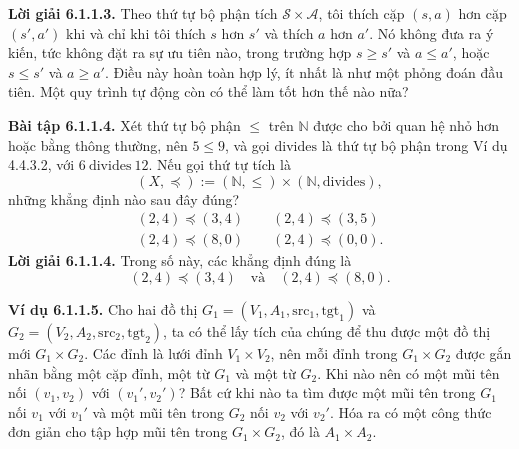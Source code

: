 \noindent\textbf{Lời giải 6.1.1.3.} Theo thứ tự bộ phận tích $\mathcal S\times\mathcal A$, tôi thích cặp $(s,a)$ hơn cặp $(s',a')$ khi và chỉ khi tôi thích $s$ hơn $s'$ và thích $a$ hơn $a'$. Nó không đưa ra ý kiến, tức không đặt ra sự ưu tiên nào, trong trường hợp $s\ge s'$ và $a\le a'$, hoặc $s\le s'$ và $a\ge a'$. Điều này hoàn toàn hợp lý, ít nhất là như một phỏng đoán đầu tiên. Một quy trình tự động còn có thể làm tốt hơn thế nào nữa?

\noindent\textbf{Bài tập 6.1.1.4.} Xét thứ tự bộ phận $\le$ trên $\mathbb N$ được cho bởi quan hệ nhỏ hơn hoặc bằng thông thường, nên $5\le9$, và gọi $\mathrm{divides}$ là thứ tự bộ phận trong Ví dụ 4.4.3.2, với $6\ \mathrm{divides}\ 12$. Nếu gọi thứ tự tích là
\[(X,\preceq):=(\mathbb N,\le)\times(\mathbb N,\mathrm{divides}),\]
những khẳng định nào sau đây đúng?
\[\begin{gathered}(2,4)\preceq(3,4)\qquad(2,4)\preceq(3,5)\\(2,4)\preceq(8,0)\qquad(2,4)\preceq(0,0).\end{gathered}\]
\noindent\textbf{Lời giải 6.1.1.4.} Trong số này, các khẳng định đúng là
\[(2,4)\preceq(3,4)\quad\text{và}\quad(2,4)\preceq(8,0).\]

\noindent\textbf{Ví dụ 6.1.1.5.} Cho hai đồ thị $G_1=(V_1,A_1,\mathrm{src}_1,\mathrm{tgt}_1)$ và $G_2=(V_2,A_2,\mathrm{src}_2,\mathrm{tgt}_2)$, ta có thể lấy tích của chúng để thu được một đồ thị mới $G_1\times G_2$. Các đỉnh là lưới đỉnh $V_1\times V_2$, nên mỗi đỉnh trong $G_1\times G_2$ được gắn nhãn bằng một cặp đỉnh, một từ $G_1$ và một từ $G_2$. Khi nào nên có một mũi tên nối $(v_1,v_2)$ với $(v_1',v_2')$? Bất cứ khi nào ta tìm được một mũi tên trong $G_1$ nối $v_1$ với $v_1'$ và một mũi tên trong $G_2$ nối $v_2$ với $v_2'$. Hóa ra có một công thức đơn giản cho tập hợp mũi tên trong $G_1\times G_2$, đó là $A_1\times A_2$.

